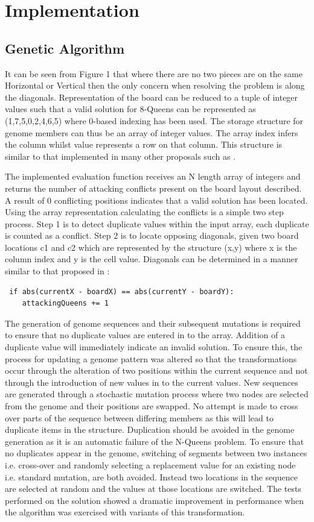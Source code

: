 \documentclass[a4paper,onecolumn,11pt]{article}
\begin{document}
\section{Implementation}
\subsection{Genetic Algorithm}
It can be seen from Figure 1 that where there are no two pieces are on the same Horizontal or Vertical then the only concern when resolving the problem is along the diagonals. Representation of the board can be reduced to a tuple of integer values such that a valid solution for 8-Queens can be represented as (1,7,5,0,2,4,6,5) where 0-based indexing has been used. The storage structure for genome members can thus be an array of integer values. The array index infers the column whilst value represents a row on that column. This structure is similar to that implemented in many other proposals such as \cite{Performance} \cite{Polynomial}.

The implemented evaluation function receives an N length array of integers and returns the number of attacking conflicts present on the board layout described. A result of 0 conflicting positions indicates that a valid solution has been located. Using the array representation calculating the conflicts is a simple two step process. Step 1 is to detect duplicate values within the input array, each duplicate is counted as a conflict. Step 2 is to locate opposing diagonals, given two board locations c1 and c2 which are represented by the structure (x,y) where x is the column index and y is the cell value. Diagonals can be determined in a manner similar to that proposed in \cite{Adaptive}: 
\begin{lstlisting}
 if abs(currentX - boardX) == abs(currentY - boardY):
	attackingQueens += 1
\end{lstlisting}

The generation of genome sequences and their subsequent mutations is required to ensure that no duplicate values are entered in to the array. Addition of a duplicate value will immediately indicate an invalid solution. To ensure this, the process for updating a genome pattern was altered so that the transformations occur through the alteration of two positions within the current sequence and not through the introduction of new values in to the current values. New sequences are generated through a stochastic mutation process where two nodes are selected from the genome and their positions are swapped. No attempt is made to cross over parts of the sequence between differing members as this will lead to duplicate items in the structure. Duplication should be avoided in the genome generation as it is an automatic failure of the N-Queens problem. To ensure that no duplicates appear in the genome, switching of segments between two instances i.e. cross-over and randomly selecting a replacement value for an existing node i.e. standard mutation, are both avoided. Instead two locations in the sequence are selected at random and the values at those locations are switched. The tests performed on the solution showed a dramatic improvement in performance when the algorithm was exercised with variants of this transformation.
\end{document}
